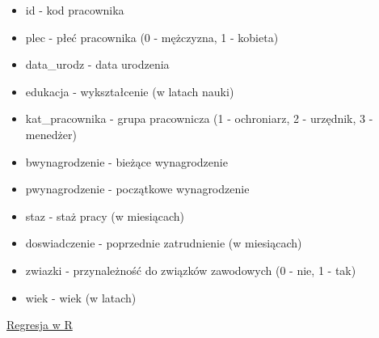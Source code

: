 \documentclass[]{book}
\providecommand{\tightlist}{%
  \setlength{\itemsep}{0pt}\setlength{\parskip}{0pt}}
\begin{document}
\begin{itemize}
\tightlist
\item
  id - kod pracownika
\item
  plec - płeć pracownika (0 - mężczyzna, 1 - kobieta)
\item
  data\_urodz - data urodzenia
\item
  edukacja - wykształcenie (w latach nauki)
\item
  kat\_pracownika - grupa pracownicza (1 - ochroniarz, 2 - urzędnik, 3 -
  menedżer)
\item
  bwynagrodzenie - bieżące wynagrodzenie
\item
  pwynagrodzenie - początkowe wynagrodzenie
\item
  staz - staż pracy (w miesiącach)
\item
  doswiadczenie - poprzednie zatrudnienie (w miesiącach)
\item
  zwiazki - przynależność do związków zawodowych (0 - nie, 1 - tak)
\item
  wiek - wiek (w latach)
\end{itemize}

\href{res/regresja20190126.R}{Regresja w R}
\end{document}
